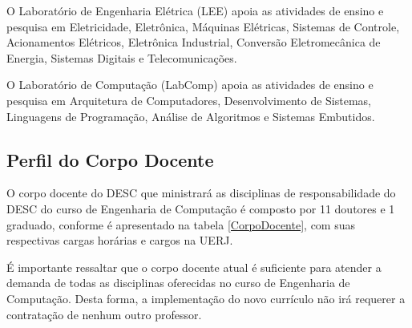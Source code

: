 O Laboratório de Engenharia Elétrica (LEE) apoia as atividades de ensino e pesquisa em Eletricidade, Eletrônica, Máquinas Elétricas, Sistemas de Controle, Acionamentos Elétricos, Eletrônica Industrial, Conversão Eletromecânica de Energia, Sistemas Digitais e Telecomunicações.

O Laboratório de Computação (LabComp) apoia as atividades de ensino e pesquisa em Arquitetura de Computadores, Desenvolvimento de Sistemas, Linguagens de Programação, Análise de Algoritmos e Sistemas Embutidos.

\subsection{Perfil do Corpo Docente}
O corpo docente do DESC que ministrará as disciplinas de responsabilidade do DESC do curso de Engenharia de Computação é composto por 11 doutores e 1 graduado, conforme é apresentado na tabela \ref{CorpoDocente}, com suas respectivas cargas horárias e cargos na UERJ.


É importante ressaltar que o corpo docente atual é suficiente para atender a demanda de todas as disciplinas oferecidas no curso de Engenharia de Computação. Desta forma, a implementação do novo currículo não irá requerer a contratação de nenhum outro professor.

